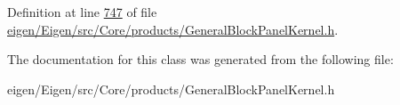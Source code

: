Definition at line \hyperlink{eigen_2_eigen_2src_2_core_2products_2_general_block_panel_kernel_8h_source_l00747}{747} of file \hyperlink{eigen_2_eigen_2src_2_core_2products_2_general_block_panel_kernel_8h_source}{eigen/\+Eigen/src/\+Core/products/\+General\+Block\+Panel\+Kernel.\+h}.



The documentation for this class was generated from the following file\+:\begin{DoxyCompactItemize}
\item 
eigen/\+Eigen/src/\+Core/products/\+General\+Block\+Panel\+Kernel.\+h\end{DoxyCompactItemize}
